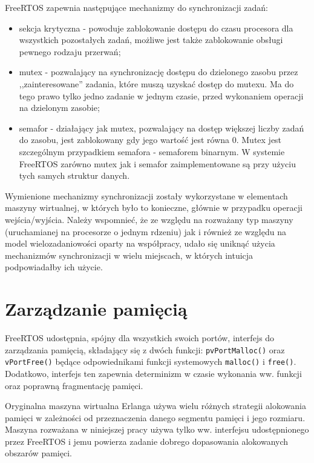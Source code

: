 FreeRTOS zapewnia następujące mechanizmy do synchronizacji zadań:
\begin{itemize}
\item sekcja krytyczna - powoduje zablokowanie dostępu do czasu procesora dla wszystkich pozostałych zadań, możliwe jest także zablokowanie obsługi pewnego rodzaju przerwań;
\item mutex - pozwalający na synchronizację dostępu do dzielonego zasobu przez ,,zainteresowane'' zadania, które muszą uzyskać dostęp do mutexu. Ma do tego prawo tylko jedno zadanie w jednym czasie, przed wykonaniem operacji na dzielonym zasobie;
\item semafor - działający jak mutex, pozwalający na dostęp większej liczby zadań do zasobu, jest zablokowany gdy jego wartość jest równa 0. Mutex jest szczególnym przypadkiem semafora - semaforem binarnym. W systemie FreeRTOS zarówno mutex jak i semafor zaimplementowane są przy użyciu tych samych struktur danych.
\end{itemize}

Wymienione mechanizmy synchronizacji zostały wykorzystane w elementach maszyny wirtualnej, w których było to konieczne, głównie w przypadku operacji wejścia/wyjścia.
Należy wspomnieć, że ze względu na rozważany typ maszyny (uruchamianej na procesorze o jednym rdzeniu) jak i również ze względu na model wielozadaniowości oparty na współpracy, udało się uniknąć użycia mechanizmów synchronizacji w wielu miejscach, w których intuicja podpowiadałby ich użycie.

\section{Zarządzanie pamięcią}
\label{sec:rtosPamiec}

FreeRTOS udostępnia, spójny dla wszystkich swoich portów, interfejs do zarządzania pamięcią, składający się z dwóch funkcji: \texttt{pvPortMalloc()} oraz \texttt{vPortFree()} będące odpowiednikami funkcji systemowych \texttt{malloc()} i \texttt{free()}. Dodatkowo, interfejs ten zapewnia determinizm w czasie wykonania ww. funkcji oraz poprawną fragmentację pamięci.

Oryginalna maszyna wirtualna Erlanga używa wielu różnych strategii alokowania pamięci w zależności od przeznaczenia danego segmentu pamięci i jego rozmiaru. Maszyna rozważana w niniejszej pracy używa tylko ww. interfejsu udostępnionego przez FreeRTOS i jemu powierza zadanie dobrego dopasowania alokowanych obszarów pamięci.

